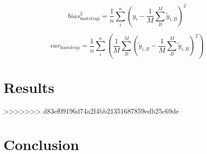 \documentclass[reprint, english, nofootinbib]{revtex4-2}
\begin{document}
\begin{equation}
\label{bootstrap_bias}
bias^2_{bootstrap} = \frac{1}{n} \sum^{n}_{i} (y_{i} - \frac{1}{M}\sum^{M}_{B} \tilde{y}_{i,B})^2 
\end{equation}

\begin{equation}
\label{bootstrap_variance}
var_{bootstrap} = \frac{1}{n} \sum^{n}_{i} (\frac{1}{M}\sum^{M}_{B} (\tilde{y}_{i,B} - \frac{1}{M}\sum^{M}_{B} \tilde{y}_{i,B})^2)
\end{equation}
\section{Results}
>>>>>>> d83ef09196d74a2f4bb21351687859edb25c69de


\section{Conclusion}

\newpage
\onecolumngrid

\newpage
\twocolumngrid
\appendix
\end{document}
